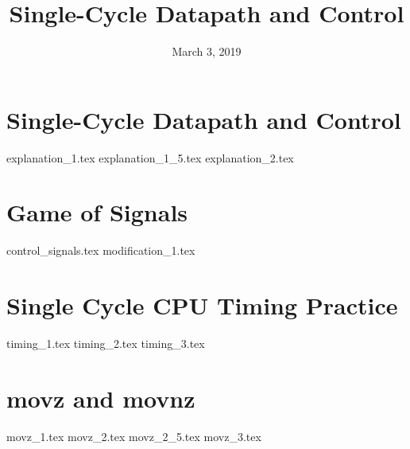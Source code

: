 \documentclass[11pt]{exam}
\title{Single-Cycle Datapath and Control}
\date{March 3, 2019}
\begin{document}
\maketitle

\section{Single-Cycle Datapath and Control}
\begin{questions}
{explanation_1.tex}
{explanation_1_5.tex}
{explanation_2.tex}
\end{questions}
\newpage

\section{Game of Signals}
\begin{questions}
{control_signals.tex}
{modification_1.tex}
\end{questions}
\newpage

\section{Single Cycle CPU Timing Practice}
\begin{questions}
{timing_1.tex}
{timing_2.tex}
{timing_3.tex}
\end{questions}
\newpage

\section{movz and movnz}
\begin{questions}
{movz_1.tex}
{movz_2.tex}
{movz_2_5.tex}
{movz_3.tex}
\end{questions}
\newpage
\end{document}
